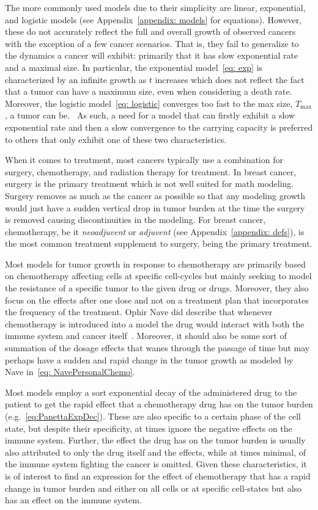 \documentclass[11pt]{amsart}
\begin{document}
The more commonly used models due to their simplicity are linear, exponential, and logistic models (see Appendix\ \ref{appendix: models} for equations).
However, these do not accurately reflect the full and overall growth of observed cancers with the exception of a few cancer scenarios.
That is, they fail to generalize to the dynamics a cancer will exhibit: primarily that it has slow exponential rate and a maximal size.
In particular, the exponential model\ \eqref{eq: exp} is characterized by an infinite growth as $t$ increases which does not reflect the fact that a tumor can have a maximum size, even when considering a death rate.
Moreover, the logistic model\ \eqref{eq: logistic} converges too fast to the max size, $T_{\max}$, a tumor can be.\ \cite{Steb23}
As such, a need for a model that can firstly exhibit a slow exponential rate and then a slow convergence to the carrying capacity is preferred to others that only exhibit one of these two characteristics.

When it comes to treatment, most cancers typically use a combination for surgery, chemotherapy, and radiation therapy for treatment.
In breast cancer, surgery is the primary treatment which is not well suited for math modeling. 
Surgery removes as much as the cancer as possible so that any modeling growth would just have a sudden vertical drop in tumor burden at the time the surgery is removed causing discontinuities in the modeling.
For breast cancer, chemotherapy, be it \textit{neoadjuvent} or \textit{adjuvent} (see Appendix\ \ref{appendix: defs}), is the most common treatment supplement to surgery, being the primary treatment.

Most models for tumor growth in response to chemotherapy are primarily based on chemotherapy affecting cells at specific cell-cycles but mainly seeking to model the resistance of a specific tumor to the given drug or drugs.
Moreover, they also focus on the effects after one dose and not on a treatment plan that incorporates the frequency of the treatment.
Ophir Nave did describe that whenever chemotherapy is introduced into a model the drug would interact with both the immune system and cancer itself\ \cite{NAVE2022e09288}.
Moreover, it should also be some sort of summation of the dosage effects that wanes through the passage of time but may perhaps have a sudden and rapid change in the tumor growth as modeled by Nave in\ \eqref{eq: NavePersonalChemo}.

Most models employ a sort exponential decay of the administered drug to the patient to get the rapid effect that a chemotherapy drug has on the tumor burden (e.g.\ \eqref{eq:PanettaExpDec}).
These are also specific to a certain phase of the cell state, but despite their specificity, at times ignore the negative effects on the immune system.
Further, the effect the drug has on the tumor burden is usually also attributed to only the drug itself and the effects, while at times minimal, of the immune system fighting the cancer is omitted.
Given these characteristics, it is of interest to find an expression for the effect of chemotherapy that has a rapid change in tumor burden and either on all cells or at specific cell-states but also has an effect on the immune system.
\end{document}
